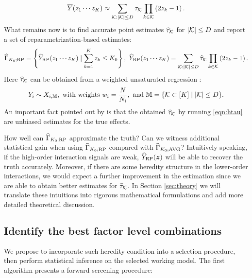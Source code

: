 \documentclass[12pt]{article}
\begin{document}
\begin{align*}
    \overline{Y}(z_1\cdots z_K) \approx \sum_{{\mathcal{K}}:|{\mathcal{K}}|\le D} \tau_{{\mathcal{K}}} \prod_{k\in {\mathcal{K}}}\left(2z_k - 1\right).
\end{align*}
What remains now is to find accurate point estimates ${\widehat{\tau}}_{\mathcal{K}}$ for $|{\mathcal{K}}|\le D$ and report a set of reparametrization-based estimates:
\begin{align*}
    {\widehat{\Gamma}}_{K_0;\operatorname{RP}} = \left\{\widehat{Y}_{\operatorname{RP}}(z_1\cdots z_K)\mid \sum_{k=1}^K{z_k} \le K_0\right\}, ~\widehat{Y}_{\operatorname{RP}}(z_1\cdots z_K) = \sum_{{\mathcal{K}}:|{\mathcal{K}}|\le D} {\widehat{\tau}}_{{\mathcal{K}}} \prod_{k\in {\mathcal{K}}}\left(2z_k - 1\right).
\end{align*}
Here ${\widehat{\tau}}_{\mathcal{K}}$ can be obtained from a weighted unsaturated regression \citep{zhao2021regression}:
\begin{align}\label{eqn:htau}
    Y_i \sim X_{i, {\mathbb{M}}}, \text{ with weights } w_i = \frac{N}{N_i}, \text{ and } {\mathbb{M}} = \{{\mathcal{K}}\subset[K]\mid  |{\mathcal{K}}|\le D\}.
\end{align}
An important fact pointed out by \cite{zhao2021regression} is that the obtained ${\widehat{\tau}}_{\mathcal{K}}$ by running \eqref{eqn:htau} are unbiased estimates for the true effects.


How well can ${\widehat{\Gamma}}_{K_0;\operatorname{RP}}$ approximate the truth? Can we witness additional statistical gain when using ${\widehat{\Gamma}}_{K_0;\operatorname{RP}}$ compared with ${\widehat{\Gamma}}_{K_0;\operatorname{AVG}}$?  Intuitively speaking, if the high-order interaction signals are weak, $\widehat{Y}_{\operatorname{RP}}({\boldsymbol{z}})$ will be able to recover the truth accurately. Moreover, if there are some heredity structure in the lower-order interactions, we would expect a further improvement in the estimation since we are able to obtain better estimates for ${\widehat{\tau}}_{\mathcal{K}}$. In Section \ref{sec:theory} we will translate these intuitions into rigorous mathematical formulations and add more detailed theoretical discussion.



\subsection{Identify the best factor level combinations}

We propose to incorporate such heredity condition into a selection procedure, then perform statistical inference on the selected working model.  The first algorithm presents a forward  screening procedure:
\end{document}
